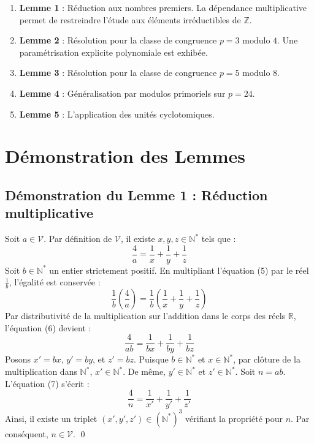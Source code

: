 \documentclass[12pt, a4paper]{article}
\begin{document}
\begin{enumerate}
\item \textbf{Lemme 1} : R\'eduction aux nombres premiers. La d\'ependance multiplicative permet de restreindre l'\'etude aux \'el\'ements irr\'eductibles de $\mathbb{Z}$.
\item \textbf{Lemme 2} : R\'esolution pour la classe de congruence $p = 3 \text{ modulo } 4$. Une param\'etrisation explicite polynomiale est exhib\'ee.
\item \textbf{Lemme 3} : R\'esolution pour la classe de congruence $p = 5 \text{ modulo } 8$.
\item \textbf{Lemme 4} : G\'en\'eralisation par modulos primoriels sur $p = 24$.
\item \textbf{Lemme 5} : L'application des unit\'es cyclotomiques.
\end{enumerate}

\vspace{1cm}

\section{D\'emonstration des Lemmes}

\subsection{D\'emonstration du Lemme 1 : R\'eduction multiplicative}
Soit $a \in \mathcal{V}$. Par d\'efinition de $\mathcal{V}$, il existe $x, y, z \in \mathbb{N}^*$ tels que :
\begin{equation}
\frac{4}{a} = \frac{1}{x} + \frac{1}{y} + \frac{1}{z}
\end{equation}
Soit $b \in \mathbb{N}^*$ un entier strictement positif. En multipliant l'\'equation (5) par le r\'eel $\frac{1}{b}$, l'\'egalit\'e est conserv\'ee :
\begin{equation}
\frac{1}{b} \left( \frac{4}{a} \right) = \frac{1}{b} \left( \frac{1}{x} + \frac{1}{y} + \frac{1}{z} \right)
\end{equation}
Par distributivit\'e de la multiplication sur l'addition dans le corps des r\'eels $\mathbb{R}$, l'\'equation (6) devient :
\begin{equation}
\frac{4}{ab} = \frac{1}{bx} + \frac{1}{by} + \frac{1}{bz}
\end{equation}
Posons $x' = bx$, $y' = by$, et $z' = bz$.
Puisque $b \in \mathbb{N}^*$ et $x \in \mathbb{N}^*$, par cl\^oture de la multiplication dans $\mathbb{N}^*$, $x' \in \mathbb{N}^*$.
De m\^eme, $y' \in \mathbb{N}^*$ et $z' \in \mathbb{N}^*$.
Soit $n = ab$. L'\'equation (7) s'\'ecrit :
\begin{equation}
\frac{4}{n} = \frac{1}{x'} + \frac{1}{y'} + \frac{1}{z'}
\end{equation}
Ainsi, il existe un triplet $(x', y', z') \in (\mathbb{N}^*)^3$ v\'erifiant la propri\'et\'e pour $n$. Par cons\'equent, $n \in \mathcal{V}$. \qed
\end{document}
